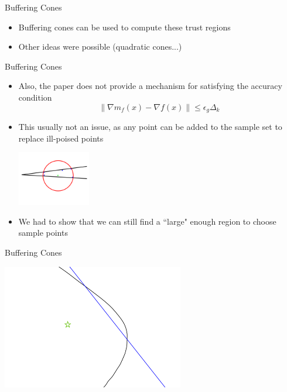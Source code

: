 \documentclass{beamer}
\newcommand{\dk}{{\Delta_k}}
\begin{document}
\begin{frame}{Buffering Cones}
	\begin{itemize}
		\item Buffering cones can be used to compute these trust regions
		\item Other ideas were possible (quadratic cones...)
	\end{itemize}
\end{frame}



\begin{frame}{Buffering Cones}
	\begin{itemize}
		\item Also, the paper does not provide a mechanism for satisfying the accuracy condition
		\[\|\nabla m_f(x) - \nabla f(x)\| \le \epsilon_g \dk \]
		\item This usually not an issue, as any point can be added to the sample set to replace ill-poised points
		\begin{center}
			\includegraphics[width=120px]{images/impossible_poised.png}
		\end{center}
		\item We had to show that we can still find a ``large" enough region to choose sample points
	\end{itemize}
\end{frame}


\begin{frame}{Buffering Cones}
	\begin{center}
		\includegraphics[width=300px]{images/explanation_1.png}
	\end{center}
\end{frame}
\end{document}
